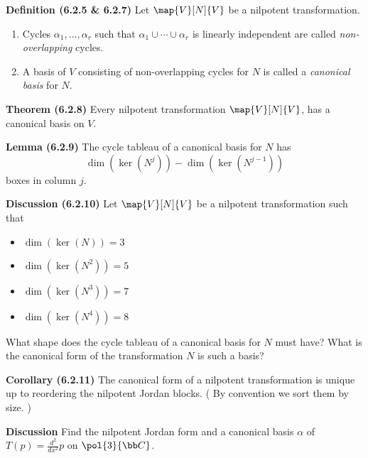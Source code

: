 \documentclass[letterpaper, 10pt]{article}
\begin{document}
\vspace{300pt}
\lb
\textbf{Definition (6.2.5 \& 6.2.7)}
\lb
Let $\map{V}[N]{V}$ be a nilpotent transformation.
\begin{enumerate}
    \item Cycles $α_1, \ldots, α_r$ such that $ α_1 \cup \cdots \cup α_r $ is linearly independent are called \emph{non-overlapping} cycles.
    \item A basis of $V$ consisting of non-overlapping cycles for $N$ is called
        a \emph{canonical basis} for $N$.
\end{enumerate}


\newpage
\lb
\textbf{Theorem (6.2.8)}
\lb
Every nilpotent transformation $\map{V}[N]{V}$, has a canonical basis on $V$.



\vspace{40pt}
\lb
\textbf{Lemma (6.2.9)}
\lb
The cycle tableau of a canonical basis for $N$ has
\[ \dim(\ker(N^j)) - \dim(\ker(N^{j-1})) \]
boxes in column $j$.

\vspace{40pt}
\lb
\textbf{Discussion (6.2.10)}
\lb
Let $\map{V}[N]{V}$ be a nilpotent transformation such that
\begin{itemize}
    \item $\dim(\ker(N)) = 3$
    \item $\dim(\ker(N^2)) = 5$
    \item $\dim(\ker(N^3)) = 7$
    \item $\dim(\ker(N^4)) = 8$
\end{itemize}
What shape does the cycle tableau of a canonical basis for $N$ must have?
What is the canonical form of the transformation $N$ is such a basis?

\vspace{200pt}
\lb
\textbf{Corollary (6.2.11)}
\lb
The canonical form of a nilpotent transformation is unique up to reordering
the nilpotent Jordan blocks. ( By convention we sort them by size. )





\newpage
\lb
\textbf{Discussion}
\lb
Find the nilpotent Jordan form and a canonical basis $α$ of $T(p) = \frac{d^2}{dx^2} p$
on $\pol{3}{\bb C}$.
\end{document}
